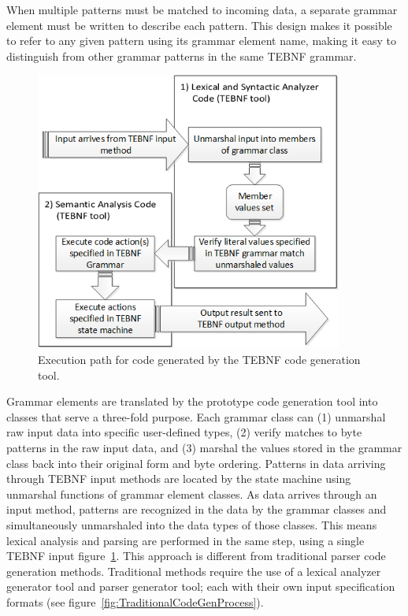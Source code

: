 \indent
When multiple patterns must be matched to incoming data, a separate grammar element must be written to describe each pattern.  This design makes it possible to refer to any given pattern using its grammar element name, making it easy to distinguish from other grammar patterns in the same TEBNF grammar.

\begin{figure}[htbp]
\centering
\includegraphics[width=0.9\textwidth]{figures/GeneratedCodeExecutionPath.png}
\caption{Execution path for code generated by the TEBNF code generation tool.}
\label{fig:GeneratedCodeExecutionPath}
\end{figure}

\indent
Grammar elements are translated by the prototype code generation tool into classes that serve a three-fold purpose.  Each grammar class can (1) unmarshal raw input data into specific user-defined types, (2) verify matches to byte patterns in the raw input data, and (3) marshal the values stored in the grammar class back into their original form and byte ordering.  Patterns in data arriving through TEBNF input methods are located by the state machine using unmarshal functions of grammar element classes.  As data arrives through an input method, patterns are recognized in the data by the grammar classes and simultaneously unmarshaled into the data types of those classes.  This means lexical analysis and parsing are performed in the same step, using a single TEBNF input figure~\ref{fig:GeneratedCodeExecutionPath}.  This approach is different from traditional parser code generation methods.  Traditional methods require the use of a lexical analyzer generator tool and parser generator tool; each with their own input specification formats (see figure~\ref{fig:TraditionalCodeGenProcess}).


